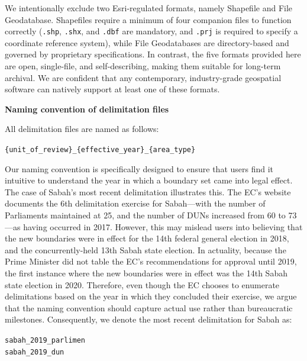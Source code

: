 \documentclass[11pt]{article}
\begin{document}
We intentionally exclude two Esri-regulated formats, namely Shapefile and File Geodatabase. Shapefiles require a minimum of four companion files to function correctly (\texttt{.shp}, \texttt{.shx}, and \texttt{.dbf} are mandatory, and \texttt{.prj} is required to specify a coordinate reference system), while File Geodatabases are directory-based and governed by proprietary specifications. In contrast, the five formats provided here are open, single-file, and self-describing, making them suitable for long-term archival. We are confident that any contemporary, industry-grade geospatial software can natively support at least one of these formats.

\textbf{Naming convention of delimitation files}

All delimitation files are named as follows:

\begin{centering}

	\texttt{\{unit\_of\_review\}\_\{effective\_year\}\_\{area\_type\}}

\end{centering}

Our naming convention is specifically designed to ensure that users find it intuitive to understand the year in which a boundary set came into legal effect. The case of Sabah's most recent delimitation illustrates this. The EC's website documents the 6th delimitation exercise for Sabah---with the number of Parliaments maintained at 25, and the number of DUNs increased from 60 to 73---as having occurred in 2017. However, this may mislead users into believing that the new boundaries were in effect for the 14th federal general election in 2018, and the concurrently-held 13th Sabah state election. In actuality, because the Prime Minister did not table the EC's recommendations for approval until 2019, the first instance where the new boundaries were in effect was the 14th Sabah state election in 2020. Therefore, even though the EC chooses to enumerate delimitations based on the year in which they concluded their exercise, we argue that the naming convention should capture actual use rather than bureaucratic milestones. Consequently, we denote the most recent delimitation for Sabah as:

\begin{centering}

	\texttt{sabah\_2019\_parlimen}\\
	\texttt{sabah\_2019\_dun}

\end{centering}
\end{document}
